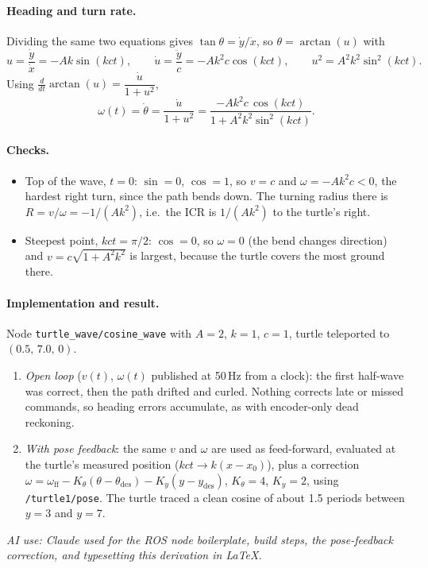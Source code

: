 \paragraph{Heading and turn rate.} Dividing the same two equations gives
$\tan\theta = \dot{y}/\dot{x}$, so $\theta = \arctan(u)$ with
\begin{equation}
  u = \frac{\dot{y}}{\dot{x}} = -Ak\sin(kct), \qquad
  \dot{u} = \frac{\ddot{y}}{c} = -Ak^{2}c\cos(kct), \qquad
  u^{2} = A^{2}k^{2}\sin^{2}(kct).
\end{equation}
Using $\frac{d}{dt}\arctan(u) = \dfrac{\dot{u}}{1+u^{2}}$,
\begin{equation}
  \omega(t) = \dot{\theta} = \frac{\dot{u}}{1+u^{2}}
  = \frac{-Ak^{2}c\,\cos(kct)}{1 + A^{2}k^{2}\sin^{2}(kct)} .
\end{equation}

\paragraph{Checks.}
\begin{itemize}
  \item Top of the wave, $t=0$: $\sin = 0$, $\cos = 1$, so $v = c$ and
        $\omega = -Ak^{2}c < 0$, the hardest right turn, since the path bends down.
        The turning radius there is $R = v/\omega = -1/(Ak^{2})$, i.e.\ the ICR is
        $1/(Ak^{2})$ to the turtle's right.
  \item Steepest point, $kct = \pi/2$: $\cos = 0$, so $\omega = 0$ (the bend changes
        direction) and $v = c\sqrt{1+A^{2}k^{2}}$ is largest, because the turtle covers
        the most ground there.
\end{itemize}

\paragraph{Implementation and result.} Node \texttt{turtle\_wave/cosine\_wave} with
$A=2$, $k=1$, $c=1$, turtle teleported to $(0.5,\,7.0,\,0)$.
\begin{enumerate}
  \item \emph{Open loop} ($v(t)$, $\omega(t)$ published at 50\,Hz from a clock): the first
        half-wave was correct, then the path drifted and curled. Nothing corrects late or
        missed commands, so heading errors accumulate, as with encoder-only dead reckoning.
  \item \emph{With pose feedback}: the same $v$ and $\omega$ are used as feed-forward, evaluated
        at the turtle's measured position ($kct \to k(x-x_0)$), plus a correction
        $\omega = \omega_{\mathrm{ff}} - K_\theta(\theta-\theta_{\mathrm{des}}) - K_y(y-y_{\mathrm{des}})$,
        $K_\theta = 4$, $K_y = 2$, using \texttt{/turtle1/pose}. The turtle traced a clean
        cosine of about 1.5 periods between $y=3$ and $y=7$.
\end{enumerate}

\noindent\textit{AI use: Claude used for the ROS node boilerplate, build steps, the
pose-feedback correction, and typesetting this derivation in \LaTeX.}
